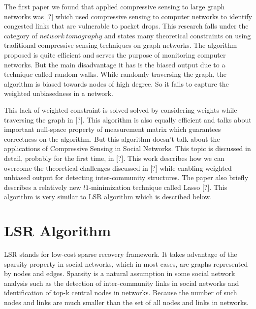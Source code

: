 \documentclass{article}
\begin{document}
The first paper we found that applied compressive sensing to large graph networks was [?] which used compressive sensing
to computer networks to identify congested links that are vulnerable to packet drops. This research falls under the
category of $network\ tomography$ and states many theoretical constraints on using traditional compressive sensing
techniques on graph networks. The algorithm proposed is quite efficient and serves the purpose of monitoring computer
networks. But the main disadvantage it has is the biased output due to a technique called random walks. While randomly
traversing the graph, the algorithm is biased towards nodes of high degree. So it fails to capture the weighted
unbiasedness in a network.

This lack of weighted constraint is solved solved by considering weights while traversing the graph in [?]. This
algorithm is also equally efficient and talks about important null-space property of measurement matrix which guarantees
correctness on the algorithm. But this algorithm doesn't talk about the applications of Compressive Sensing in Social
Networks. This topic is discussed in detail, probably for the first time, in [?]. This work describes how we can
overcome the theoretical challenges discussed in [?] while enabling weighted unbiased output for detecting
inter-community structures. The paper also briefly describes a relatively new $l1$-minimization technique called Lasso
[?]. This algorithm is very similar to LSR algorithm which is described below.  
\section{LSR Algorithm}
LSR stands for low-cost sparse recovery framework. It takes advantage of the sparsity property in social networks, which in most cases, are graphs represented by nodes and edges. Sparsity is a natural assumption in some social network analysis such as the detection of inter-community links in social networks and identification of top-k central nodes in networks. Because the number of such nodes and links are much smaller than the set of all nodes and links in networks.
\end{document}
